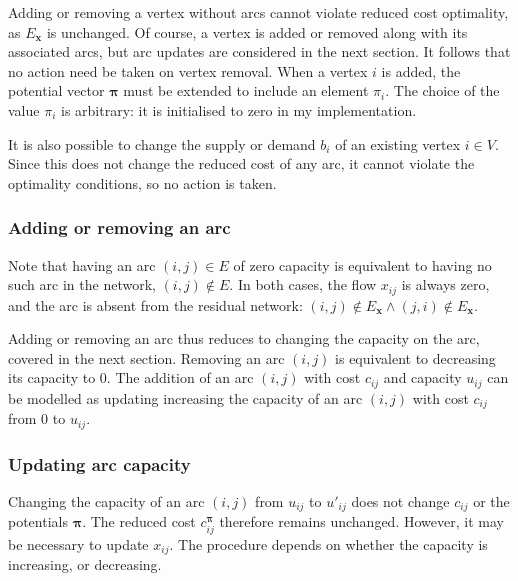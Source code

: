 Adding or removing a vertex without arcs cannot violate reduced cost optimality, as $E_\mathbf{x}$ is unchanged. Of course, a vertex is added or removed along with its associated arcs, but arc updates are considered in the next section. It follows that no action need be taken on vertex removal. When a vertex $i$ is added, the potential vector $\boldsymbol{\pi}$ must be extended to include an element $\pi_i$. The choice of the value $\pi_i$ is arbitrary: it is initialised to zero in my implementation.

It is also possible to change the supply or demand $b_i$ of an existing vertex $i \in V$. Since this does not change the reduced cost of any arc, it cannot violate the optimality conditions, so no action is taken.

\subsubsection{Adding or removing an arc}

Note that having an arc $(i,j) \in E$ of zero capacity is equivalent to having no such arc in the network, $(i,j) \not \in E$. In both cases, the flow $x_{ij}$ is always zero, and the arc is absent from the residual network: $(i,j) \not \in E_\mathbf{x} \land (j,i) \not \in E_\mathbf{x}$.

Adding or removing an arc thus reduces to changing the capacity on the arc, covered in the next section. Removing an arc $(i,j)$ is equivalent to decreasing its capacity to $0$. The addition of an arc $(i,j)$ with cost $c_{ij}$ and capacity $u_{ij}$ can be modelled as updating increasing the capacity of an arc $(i,j)$ with cost $c_{ij}$ from $0$ to $u_{ij}$.

\subsubsection{Updating arc capacity}

Changing the capacity of an arc $(i,j)$ from $u_{ij}$ to $u'_{ij}$ does not change $c_{ij}$ or the potentials $\boldsymbol{\pi}$. The reduced cost $c_{ij}^{\boldsymbol{\pi}}$ therefore remains unchanged. However, it may be necessary to update $x_{ij}$. The procedure depends on whether the capacity is increasing, or decreasing.

